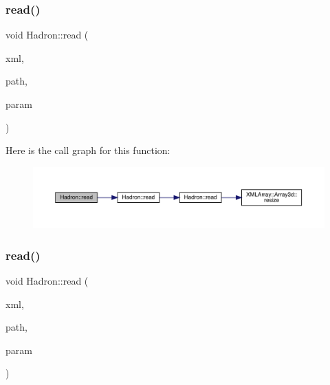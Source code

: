 \subsubsection{\texorpdfstring{read()}{read()}\hspace{0.1cm}{\footnotesize\ttfamily [14/94]}}
{\footnotesize\ttfamily void Hadron\+::read (\begin{DoxyParamCaption}\item[{\mbox{\hyperlink{classADATXML_1_1XMLReader}{X\+M\+L\+Reader}} \&}]{xml,  }\item[{const std\+::string \&}]{path,  }\item[{\mbox{\hyperlink{structHadron_1_1KeyHadronNPartNPtCorr__t_1_1NPoint__t}{Key\+Hadron\+N\+Part\+N\+Pt\+Corr\+\_\+t\+::\+N\+Point\+\_\+t}} \&}]{param }\end{DoxyParamCaption})}

Here is the call graph for this function\+:
\nopagebreak
\begin{figure}[H]
\begin{center}
\leavevmode
\includegraphics[width=350pt]{d1/daf/namespaceHadron_aef0c0dfd0f87842b485511132f1c405f_cgraph}
\end{center}
\end{figure}
\mbox{\label{namespaceHadron_aa4df93329eeddeec176cd9df5abe9ce1}} 
\subsubsection{\texorpdfstring{read()}{read()}\hspace{0.1cm}{\footnotesize\ttfamily [15/94]}}
{\footnotesize\ttfamily void Hadron\+::read (\begin{DoxyParamCaption}\item[{\mbox{\hyperlink{classADATXML_1_1XMLReader}{X\+M\+L\+Reader}} \&}]{xml,  }\item[{const std\+::string \&}]{path,  }\item[{\mbox{\hyperlink{structHadron_1_1ValTimeSlice__t}{Val\+Time\+Slice\+\_\+t}} \&}]{param }\end{DoxyParamCaption})}



